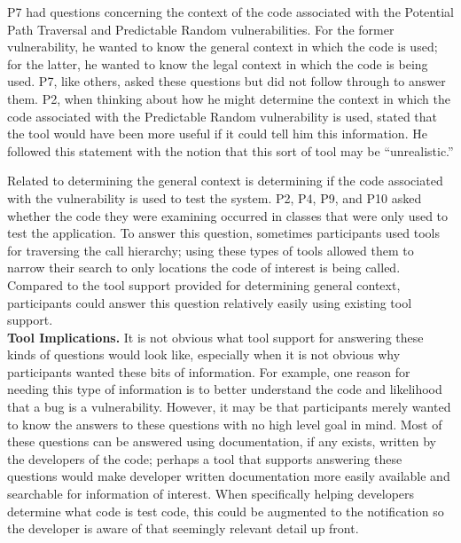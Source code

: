 \documentclass[conference]{IEEEtran}
\begin{document}
 
P7 had questions concerning the context of the code associated with the Potential Path Traversal and Predictable Random vulnerabilities.
For the former vulnerability, he wanted to know the general context in which the code is used; for the latter, he wanted to know the legal context in which the code is being used.
P7, like others, asked these questions but did not follow through to answer them. 
P2, when thinking about how he might determine the context in which the code associated with the Predictable Random vulnerability is used, stated that the tool would have been more useful if it could tell him this information.
He followed this statement with the notion that this sort of tool may be ``unrealistic.'' 


Related to determining the general context is determining if the code associated with the vulnerability is used to test the system. 
P2, P4, P9, and P10 asked whether the code they were examining occurred in classes that were only used to test the application. 
To answer this question, sometimes participants used tools for traversing the call hierarchy; using these types of tools allowed them to narrow their search to only locations the code of interest is being called.
Compared to the tool support provided for determining general context, participants could answer this question relatively easily using existing tool support.
\\

\noindent\textbf{Tool Implications.}
It is not obvious what tool support for answering these kinds of questions would look like, especially when it is not obvious why participants wanted these bits of information. 
For example, one reason for needing this type of information is to better understand the code and likelihood that a bug is a vulnerability. 
However, it may be that participants merely wanted to know the answers to these questions with no high level goal in mind.
Most of these questions can be answered using documentation, if any exists, written by the developers of the code; perhaps a tool that supports answering these questions would make developer written documentation more easily available and searchable for information of interest.
When specifically helping developers determine what code is test code, this could be augmented to the notification so the developer is aware of that seemingly relevant detail up front.
\end{document}
